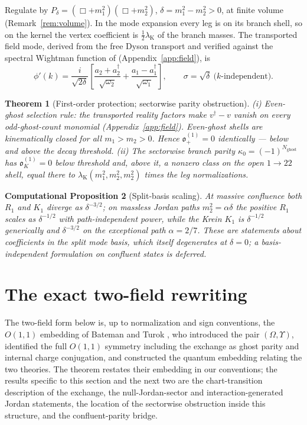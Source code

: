 \documentclass[11pt]{article}
\newtheorem{theorem}{Theorem}[section]
\newtheorem{cproposition}[theorem]{Computational Proposition}
\theoremstyle{definition}
\theoremstyle{remark}
\newcommand{\w}{\omega}
\newcommand{\dg}{\dagger}
\newcommand{\ob}{\mathfrak o}
\begin{document}
Regulate by $P_\delta=(\Box+m_1^2)(\Box+m_2^2)$,
$\delta=m_1^2-m_2^2>0$, at finite volume
(Remark~\ref{rem:volume}).  In the mode expansion every leg is on its
branch shell, so on the kernel the vertex coefficient is
$\tfrac12\lambda_{\mathrm K}$ of the branch masses.  The transported
field mode, derived from the free Dyson transport and verified against
the spectral Wightman function of \cite{paperIII}
(Appendix~\ref{app:field}), is
\begin{equation}
\phi'(k)=\frac{i}{\sqrt{2\delta}}
\left[\frac{a_2+a_2^{\dg}}{\sqrt{\w_2}}
+\frac{a_1-a_1^{\dg}}{\sqrt{\w_1}}\right],
\qquad
\sigma=\sqrt\delta\ \text{($k$-independent)}.
\end{equation}

\begin{theorem}[First-order protection; sectorwise parity obstruction]
\label{thm:firstfield}
(i) \emph{Even-ghost selection rule}: the transported reality factors
make $v^{\dg}-v$ vanish on every odd-ghost-count monomial
(Appendix~\ref{app:field}).  Even-ghost shells are kinematically closed
for all $m_1>m_2>0$.  Hence $\ob_+^{(1)}=0$ identically --- below and
above the decay threshold.
(ii) The sectorwise branch parity $\kappa_0=(-1)^{N_{\mathrm{ghost}}}$
has $\ob_K^{(1)}=0$ below threshold and, above it, a nonzero class on
the open $1\to22$ shell, equal there to
$\lambda_{\mathrm K}(m_1^2,m_2^2,m_2^2)$ times the leg normalizations.
\end{theorem}

\begin{cproposition}[Split-basis scaling]
At massive confluence both $R_1$ and $K_1$ diverge as $\delta^{-3/2}$;
on massless Jordan paths $m_2^2=\alpha\delta$ the positive $R_1$ scales
as $\delta^{-1/2}$ with path-independent power, while the Krein $K_1$
is $\delta^{-1/2}$ generically and $\delta^{-3/2}$ on the exceptional
path $\alpha=2/7$.  These are statements about coefficients in the
split mode basis, which itself degenerates at $\delta=0$; a
basis-independent formulation on confluent states is deferred.
\end{cproposition}

\section{The exact two-field rewriting}\label{sec:twofield}

The two-field form below is, up to normalization and sign conventions,
the $O(1,1)$ embedding of Bateman and Turok \cite{BT2026}, who
introduced the pair $(\Omega,\Upsilon)$, identified the full $O(1,1)$
symmetry including the exchange as ghost parity and internal charge
conjugation, and constructed the quantum embedding relating the two
theories.  The theorem restates their embedding in our conventions;
the results specific to this section and the next two are the
chart-transition description of the exchange, the null-Jordan-sector
and interaction-generated Jordan statements, the location of the
sectorwise obstruction inside this structure, and the confluent-parity
bridge.
\end{document}
